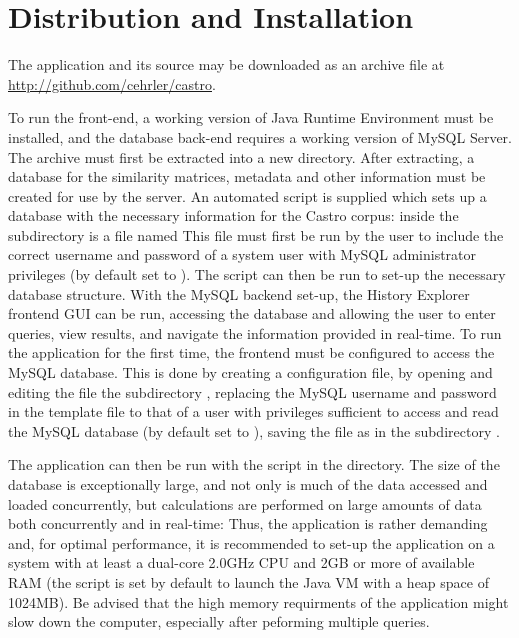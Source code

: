 \section{Distribution and Installation}
The application and its source may be downloaded as an archive file at \url{http://github.com/cehrler/castro}.

To run the front-end, a working version of Java Runtime Environment must be installed, and the
database back-end requires a working version of MySQL Server. The archive must first be extracted
into a new directory. After extracting, a database for the similarity matrices, metadata and other
information must be created for use by the server. An automated script is supplied which sets up a
database with the necessary information for the Castro corpus: inside the 
subdirectory is a file named  This file must first be run by the user to include
the correct username and password of a system user with MySQL administrator privileges (by default
set to ). The script can then be run to set-up the necessary database structure.
With the MySQL backend set-up, the History Explorer frontend GUI can be run, accessing the database
and allowing the user to enter queries, view results, and navigate the information provided in
real-time. To run the application for the first time, the frontend must be configured to access the
MySQL database. This is done by creating a configuration file, by opening and editing the file
 the subdirectory , replacing the MySQL username
and password in the template file to that of a user with privileges sufficient to access and read
the MySQL database (by default set to ), saving the file as  in the
subdirectory .

The application can then be run with the script  in the  directory. The size of the database is exceptionally large, and not only is much of the data accessed and loaded concurrently, but calculations are performed on large amounts of data both concurrently and in real-time: Thus, the application is rather demanding and, for optimal performance, it is recommended to set-up the application on a system with at least a dual-core 2.0GHz CPU and 2GB or more of available RAM (the script is set by default to launch the Java VM with a heap space of 1024MB). Be advised that the high memory requirments of the application might slow down the computer, especially after peforming multiple queries. 

